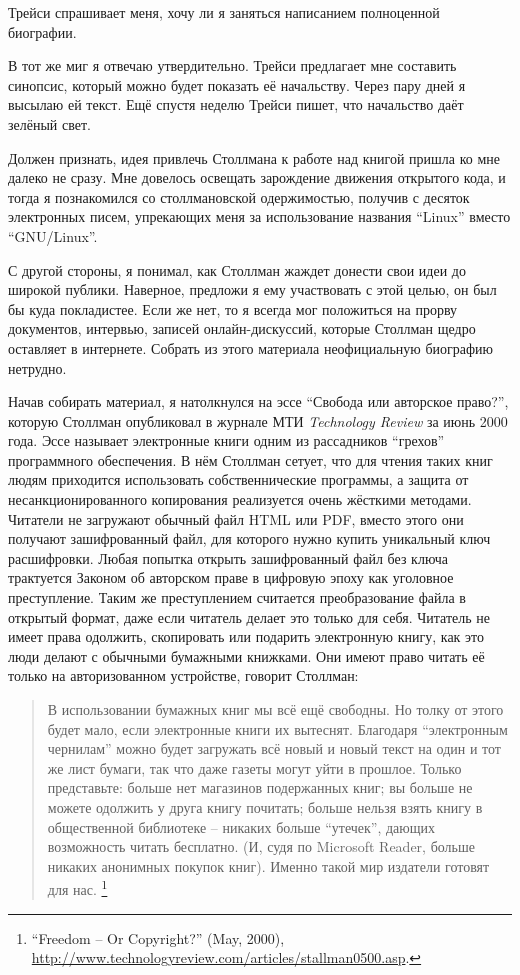 Трейси спрашивает меня, хочу ли я заняться написанием полноценной биографии.

В тот же миг я отвечаю утвердительно. Трейси предлагает мне составить синопсис, который можно будет показать её начальству. Через пару дней я высылаю ей текст. Ещё спустя неделю Трейси пишет, что начальство даёт зелёный свет.

Должен признать, идея привлечь Столлмана к работе над книгой пришла ко мне далеко не сразу. Мне довелось освещать зарождение движения открытого кода, и тогда я познакомился со столлмановской одержимостью, получив с десяток электронных писем, упрекающих меня за использование названия \enquote{Linux} вместо \enquote{GNU/Linux}.

С другой стороны, я понимал, как Столлман жаждет донести свои идеи до широкой публики. Наверное, предложи я ему участвовать с этой целью, он был бы куда покладистее. Если же нет, то я всегда мог положиться на прорву документов, интервью, записей онлайн-дискуссий, которые Столлман щедро оставляет в интернете. Собрать из этого материала неофициальную биографию нетрудно.

Начав собирать материал, я натолкнулся на эссе \enquote{Свобода или авторское право?}, которую Столлман опубликовал в журнале МТИ \textit{Technology Review} за июнь 2000 года. Эссе называет электронные книги одним из рассадников \enquote{грехов} программного обеспечения. В нём Столлман сетует, что для чтения таких книг людям приходится использовать собственнические программы, а защита от несанкционированного копирования реализуется очень жёсткими методами. Читатели не загружают обычный файл HTML или PDF, вместо этого они получают зашифрованный файл, для которого нужно купить уникальный ключ расшифровки. Любая попытка открыть зашифрованный файл без ключа трактуется Законом об авторском праве в цифровую эпоху как уголовное преступление. Таким же преступлением считается преобразование файла в открытый формат, даже если читатель делает это только для себя. Читатель не имеет права одолжить, скопировать или подарить электронную книгу, как это люди делают с обычными бумажными книжками. Они имеют право читать её только на авторизованном устройстве, говорит Столлман:

\begin{quote}
В использовании бумажных книг мы всё ещё свободны. Но толку от этого будет мало, если электронные книги их вытеснят. Благодаря \enquote{электронным чернилам} можно будет загружать всё новый и новый текст на один и тот же лист бумаги, так что даже газеты могут уйти в прошлое. Только представьте: больше нет магазинов подержанных книг; вы больше не можете одолжить у друга книгу почитать; больше нельзя взять книгу в общественной библиотеке -- никаких больше \enquote{утечек}, дающих возможность читать бесплатно. (И, судя по Microsoft Reader, больше никаких анонимных покупок книг). Именно такой мир издатели готовят для нас. \footnote{\enquote{Freedom -- Or Copyright?} (May, 2000), \url{http://www.technologyreview.com/articles/stallman0500.asp}.}
\end{quote}

